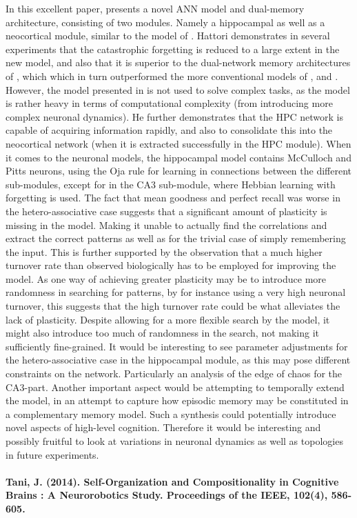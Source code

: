 In this excellent paper, \cite{Hattori2014} presents a novel ANN model and dual-memory architecture, consisting of two modules. Namely a hippocampal as well as a neocortical module, similar to the model of \cite{McClelland1995}. Hattori demonstrates in several experiments that the catastrophic forgetting is reduced to a large extent in the new model, and also that it is superior to the dual-network memory architectures of \cite{Hattori2010}, which which in turn outperformed the more conventional models of \cite{Ans1997}, and \cite{French1997}. However, the model presented in \cite{Hattori2014} is not used to solve complex tasks, as the model is rather heavy in terms of computational complexity (from introducing more complex neuronal dynamics). He further demonstrates that the HPC network is capable of acquiring information rapidly, and also to consolidate this into the neocortical network (when it is extracted successfully in the HPC module).
When it comes to the neuronal models, the hippocampal model contains McCulloch and Pitts neurons, using the Oja rule for learning in connections between the different sub-modules, except for in the CA3 sub-module, where Hebbian learning with forgetting is used.
The fact that mean goodness and perfect recall was worse in the hetero-associative case suggests that a significant amount of plasticity is missing in the model. Making it unable to actually find the correlations and extract the correct patterns as well as for the trivial case of simply remembering the input. This is further supported by the observation that a much higher turnover rate than observed biologically has to be employed for improving the model. As one way of achieving greater plasticity may be to introduce more randomness in searching for patterns, by for instance using a very high neuronal turnover, this suggests that the high turnover rate could be what alleviates the lack of plasticity. Despite allowing for a more flexible search by the model, it might also introduce too much of randomness in the search, not making it sufficiently fine-grained. It would be interesting to see parameter adjustments for the hetero-associative case in the hippocampal module, as this may pose different constraints on the network. Particularly an analysis of the edge of chaos for the CA3-part. Another important aspect would be attempting to temporally extend the model, in an attempt to capture how episodic memory may be constituted in a complementary memory model. Such a synthesis could potentially introduce novel aspects of high-level cognition. Therefore it would be interesting and possibly fruitful to look at variations in neuronal dynamics as well as topologies in future experiments.
\\
\\
\textbf{Tani, J. (2014). Self-Organization and Compositionality in Cognitive Brains : A Neurorobotics Study. Proceedings of the IEEE, 102(4), 586-605.}

